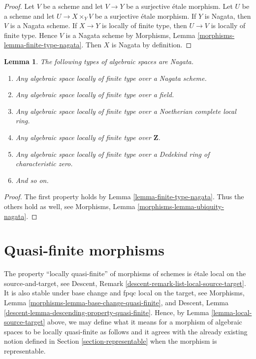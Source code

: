 \documentclass{stacks-project}
\theoremstyle{plain}
\newtheorem{lemma}[subsection]{Lemma}
\theoremstyle{definition}
\theoremstyle{remark}
\numberwithin{equation}{subsection}
\begin{document}
\begin{proof}
Let $V$ be a scheme and let $V \to Y$ be a surjective \'etale morphism.
Let $U$ be a scheme and let $U \to X \times_Y V$ be a surjective \'etale
morphism. If $Y$ is Nagata, then $V$ is a Nagata scheme.
If $X \to Y$ is locally of finite type, then $U \to V$ is locally
of finite type. Hence $V$ is a Nagata scheme by
Morphisms, Lemma \ref{morphisms-lemma-finite-type-nagata}.
Then $X$ is Nagata by definition.
\end{proof}

\begin{lemma}
\label{lemma-ubiquity-nagata}
The following types of algebraic spaces are Nagata.
\begin{enumerate}
\item Any algebraic space locally of finite type over a Nagata scheme.
\item Any algebraic space locally of finite type over a field.
\item Any algebraic space locally of finite type over a
Noetherian complete local ring.
\item Any algebraic space locally of finite type over $\mathbf{Z}$.
\item Any algebraic space locally of finite type over a Dedekind ring of
characteristic zero.
\item And so on.
\end{enumerate}
\end{lemma}

\begin{proof}
The first property holds by Lemma \ref{lemma-finite-type-nagata}.
Thus the others hold as well, see
Morphisms, Lemma \ref{morphisms-lemma-ubiquity-nagata}.
\end{proof}








\section{Quasi-finite morphisms}
\label{section-quasi-finite}

\noindent
The property ``locally quasi-finite'' of morphisms of schemes is
\'etale local on the source-and-target, see
Descent, Remark \ref{descent-remark-list-local-source-target}.
It is also stable under base change and fpqc local on the target, see
Morphisms, Lemma \ref{morphisms-lemma-base-change-quasi-finite}, and
Descent, Lemma \ref{descent-lemma-descending-property-quasi-finite}.
Hence, by
Lemma \ref{lemma-local-source-target}
above, we may define what it means for a morphism of algebraic spaces
to be locally quasi-finite as
follows and it agrees with the already existing notion defined in
Section \ref{section-representable}
when the morphism is representable.
\end{document}
